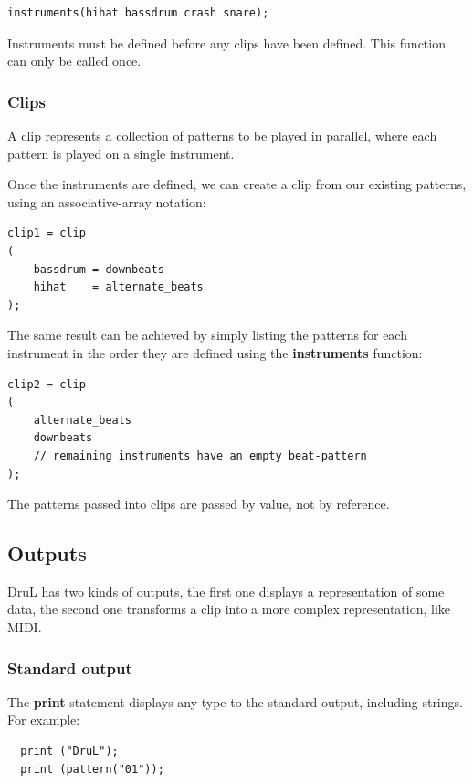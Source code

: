 \begin{verbatim}
instruments(hihat bassdrum crash snare);
\end{verbatim}

Instruments must be defined before any clips have been defined. This function 
can only be called once.

\subsubsection{Clips}

A clip represents a collection of patterns to be played in parallel, where each pattern is played on a single instrument.

Once the instruments are defined, we can create a clip from our existing patterns, using an
associative-array notation:

\begin{verbatim}
clip1 = clip
(
    bassdrum = downbeats
    hihat    = alternate_beats
);
\end{verbatim}
The same result can be achieved by simply listing the patterns for each instrument in the order they are defined using the \textbf{instruments} function:
\begin{verbatim}
clip2 = clip
(
    alternate_beats
    downbeats
    // remaining instruments have an empty beat-pattern
);

\end{verbatim}
The patterns passed into clips are passed by value, not by reference.





\subsection{Outputs}

DruL has two kinds of outputs, the first one displays a
representation of some data, the second one transforms a clip into a
more complex representation, like MIDI.

\subsubsection{Standard output}

The \textbf{print} statement displays any type to the standard
output, including strings. For example:
\begin{verbatim}
  print ("DruL");
  print (pattern("01"));
\end{verbatim}

